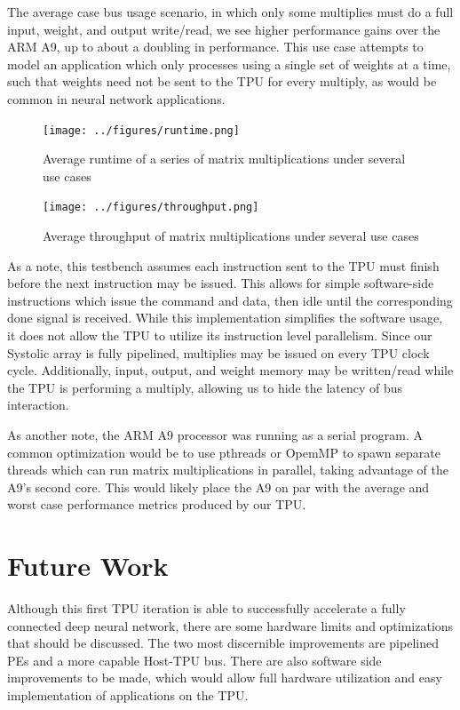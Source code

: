 \documentclass[11pt, conference, onecolumn]{IEEEtran}
\begin{document}
        The average case bus usage scenario, in which only some multiplies must do a
        full input, weight, and output write/read, we see higher performance gains over
        the ARM A9, up to about a doubling in performance. This use case attempts to model
        an application which only processes using a single set of weights at a time, such
        that weights need not be sent to the TPU for every multiply, as would be common
        in neural network applications.

        \begin{figure}[htbp]
            \centering
            \texttt{[image: ../figures/runtime.png]}
            \caption{Average runtime of a series of matrix multiplications under several
                     use cases}
        \end{figure}

        \begin{figure}[htbp]
            \centering
            \texttt{[image: ../figures/throughput.png]}
            \caption{Average throughput of matrix multiplications under several use cases}
        \end{figure}

        As a note, this testbench assumes each instruction sent to the TPU must finish
        before the next instruction may be issued. This allows for simple software-side
        instructions which issue the command and data, then idle until the corresponding
        done signal is received. While this implementation simplifies the software usage,
        it does not allow the TPU to utilize its instruction level parallelism. Since our
        Systolic array is fully pipelined, multiplies may be issued on every TPU clock
        cycle. Additionally, input, output, and weight memory may be written/read while
        the TPU is performing a multiply, allowing us to hide the latency of bus
        interaction.

        As another note, the ARM A9 processor was running as a serial program. A
        common optimization would be to use pthreads or OpemMP to spawn separate threads
        which can run matrix multiplications in parallel, taking advantage of the A9's
        second core. This would likely place the A9 on par with the average and worst case
        performance metrics produced by our TPU.

\section{Future Work}
    Although this first TPU iteration is able to successfully accelerate a fully connected
    deep neural network, there are some hardware limits and optimizations that should be
    discussed. The two most discernible improvements are pipelined PEs and a more capable
    Host-TPU bus. There are also software side improvements to be made, which would allow
    full hardware utilization and easy implementation of applications on the TPU.
\end{document}
